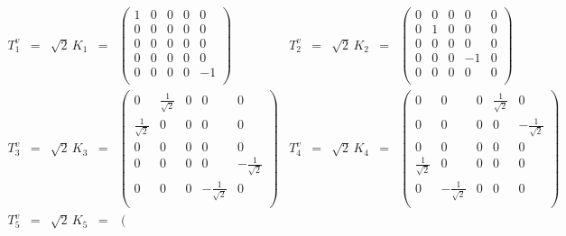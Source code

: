 \documentclass[10pt,a4paper]{article}
\newcommand{\so}{\mathfrak{so}}
\newcommand{\sym}{\mathfrak{sp}}
\begin{document}
\begin{table}[htb]
\caption{\it In this table we display the complete list of the 10 generators  of the $\so(2,3)$ Lie algebra, that are in one-to-one correspondence with and in the same order as the generators of the $\sym(4,\mathbb{R})$ Lie algebra listed
in table \ref{s10genni}. \label{v10genni}}
$$
\begin{array}{||lclcl||lclcl||}
\hline\hline
 T^v_1 & = & \sqrt{2}\,K_1 & = &  \left(
\begin{array}{ccccc}
 1 & 0 & 0 & 0 & 0 \\
 0 & 0 & 0 & 0 & 0 \\
 0 & 0 & 0 & 0 & 0 \\
 0 & 0 & 0 & 0 & 0 \\
 0 & 0 & 0 & 0 & -1 \\
\end{array}
\right) & T^v_2 & = & \sqrt{2}\,K_2 & = & \left(
\begin{array}{ccccc}
 0 & 0 & 0 & 0 & 0 \\
 0 & 1 & 0 & 0 & 0 \\
 0 & 0 & 0 & 0 & 0 \\
 0 & 0 & 0 & -1 & 0 \\
 0 & 0 & 0 & 0 & 0 \\
\end{array}
\right)\\
\hline
 T^v_3 & = & \sqrt{2}\,K_3 & = & \left(
\begin{array}{ccccc}
 0 & \frac{1}{\sqrt{2}} & 0 & 0 & 0 \\
 \frac{1}{\sqrt{2}} & 0 & 0 & 0 & 0 \\
 0 & 0 & 0 & 0 & 0 \\
 0 & 0 & 0 & 0 & -\frac{1}{\sqrt{2}} \\
 0 & 0 & 0 & -\frac{1}{\sqrt{2}} & 0 \\
\end{array}
\right) & T^v_4 & = & \sqrt{2}\,K_4 & = & \left(
\begin{array}{ccccc}
 0 & 0 & 0 & \frac{1}{\sqrt{2}} & 0 \\
 0 & 0 & 0 & 0 & -\frac{1}{\sqrt{2}} \\
 0 & 0 & 0 & 0 & 0 \\
 \frac{1}{\sqrt{2}} & 0 & 0 & 0 & 0 \\
 0 & -\frac{1}{\sqrt{2}} & 0 & 0 & 0 \\
\end{array}
\right) \\
\hline
 T^v_5 & = & \sqrt{2}\,K_5 & = & \left(
\begin{array}{ccccc}

\end{array}
\end{array}$$
\end{table}
\end{document}

